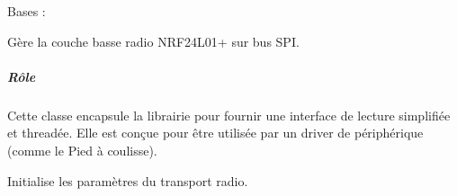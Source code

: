 \documentclass[letterpaper,10pt,french]{sphinxmanual}
\begin{document}
\begin{fulllineitems}
\label{\detokenize{api/hardware.transports:hardware.transports.nrf24_transport.Nrf24Transport}}
\pysigstartsignatures
\pysiglinewithargsret
{}
{\sphinxparamcomma {}\sphinxparamcomma {}\sphinxparamcomma {}}
{}
\pysigstopsignatures
\sphinxAtStartPar
Bases : 

\sphinxAtStartPar
Gère la couche basse radio NRF24L01+ sur bus SPI.


\subparagraph{Rôle}
\label{\detokenize{api/hardware.transports:role}}
\sphinxAtStartPar
Cette classe encapsule la librairie  pour fournir une interface
de lecture simplifiée et threadée. Elle est conçue pour être utilisée
par un driver de périphérique (comme le Pied à coulisse).

\begin{fulllineitems}
\label{\detokenize{api/hardware.transports:hardware.transports.nrf24_transport.Nrf24Transport.__init__}}
\pysigstartsignatures
\pysiglinewithargsret
{}
{\sphinxparamcomma {}\sphinxparamcomma {}\sphinxparamcomma {}}
{}
\pysigstopsignatures
\sphinxAtStartPar
Initialise les paramètres du transport radio.



\end{fulllineitems}
\end{fulllineitems}
\end{document}
